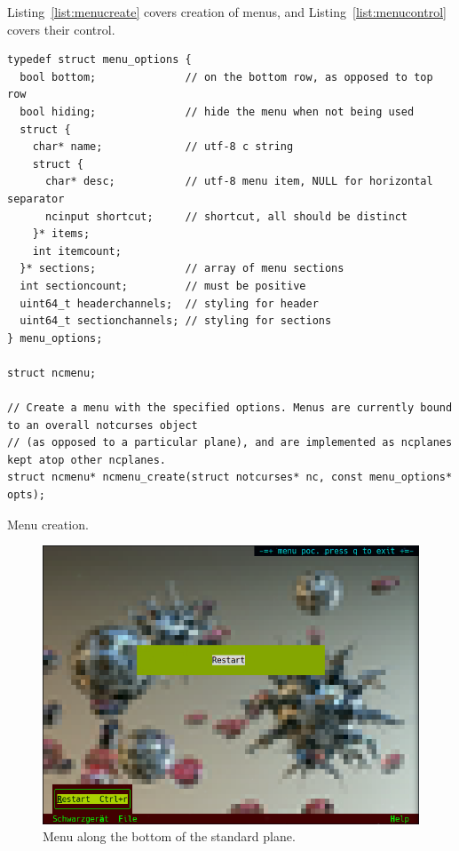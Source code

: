 \documentclass[letterpaper,10pt]{article}
\begin{document}
Listing~\ref{list:menucreate} covers creation of menus, and Listing~\ref{list:menucontrol}
covers their control.

\begin{listing}[!htb]
\begin{verbatim}
typedef struct menu_options {
  bool bottom;              // on the bottom row, as opposed to top row
  bool hiding;              // hide the menu when not being used
  struct {
    char* name;             // utf-8 c string
    struct {
      char* desc;           // utf-8 menu item, NULL for horizontal separator
      ncinput shortcut;     // shortcut, all should be distinct
    }* items;
    int itemcount;
  }* sections;              // array of menu sections
  int sectioncount;         // must be positive
  uint64_t headerchannels;  // styling for header
  uint64_t sectionchannels; // styling for sections
} menu_options;

struct ncmenu;

// Create a menu with the specified options. Menus are currently bound to an overall notcurses object
// (as opposed to a particular plane), and are implemented as ncplanes kept atop other ncplanes.
struct ncmenu* ncmenu_create(struct notcurses* nc, const menu_options* opts);
\end{verbatim}
\caption{Menu creation.}
\label{list:menucreate}
\end{listing}

\begin{figure}
    \centering
    \includegraphics[width=.75\linewidth]{media/menubottom.png}
    \caption{Menu along the bottom of the standard plane.}
\end{figure}
\end{document}
